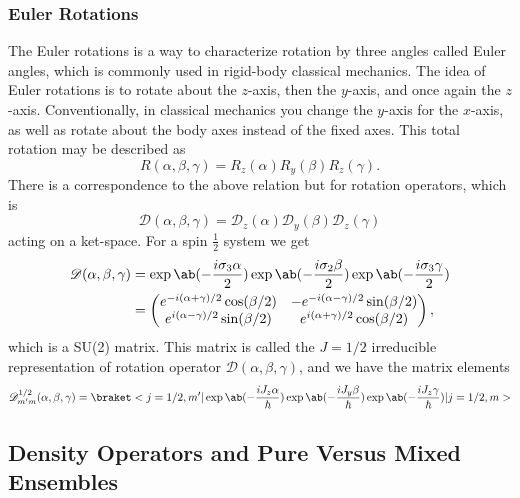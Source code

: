 \subsubsection{Euler Rotations}
The Euler rotations is a way to characterize rotation by three angles called Euler angles, which is commonly used in rigid-body classical mechanics. The idea of Euler rotations is to rotate about the $z$-axis, then the $y$-axis, and once again the $z$-axis. Conventionally, in classical mechanics you change the $y$-axis for the $x$-axis, as well as rotate about the body axes instead of the fixed axes. This total rotation may be described as
\begin{equation}
    R(\alpha,\beta,\gamma) = R_z(\alpha) R_y(\beta) R_z(\gamma).
\end{equation}
There is a correspondence to the above relation but for rotation operators, which is
\begin{equation}
    \mathscr{D}(\alpha,\beta,\gamma) = \mathscr{D}_z(\alpha) \mathscr{D}_y(\beta) \mathscr{D}_z(\gamma)
\end{equation}
acting on a ket-space. For a spin $\frac{1}{2}$ system we get 
\begin{align}
    \mathscr{D}(\alpha,\beta,\gamma) &= \exp\ab(-\frac{i\sigma_3\alpha}{2})\exp\ab(-\frac{i\sigma_2\beta}{2})\exp\ab(-\frac{i\sigma_3\gamma}{2})\\
    &=
        \begin{pmatrix}
            e^{-i(\alpha+\gamma)/2}\cos(\beta/2)    & -e^{-i(\alpha-\gamma)/2}\sin(\beta/2)\\
            e^{i(\alpha-\gamma)/2}\sin(\beta/2)     & e^{i(\alpha+\gamma)/2}\cos(\beta/2)
        \end{pmatrix},
\end{align}
which is a SU(2) matrix. This matrix is called the $J=1/2$ irreducible representation of rotation operator $\mathscr{D}(\alpha, \beta, \gamma)$, and we have the matrix elements
\begin{equation}
    \mathscr{D}_{m'm}^{1/2}(\alpha,\beta,\gamma) = \bkop{j=1/2, m'}{ \exp\ab(-\frac{iJ_z \alpha}{\hbar}) \exp\ab(-\frac{iJ_y \beta}{\hbar}) \exp\ab(-\frac{iJ_z \gamma}{\hbar}) }{j=1/2,m}
\end{equation}

\subsection{Density Operators and Pure Versus Mixed Ensembles}
